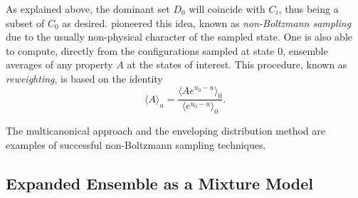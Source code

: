 \documentclass[journal=jctcce,manuscript=article,layout=twocolumn]{achemso}
\begin{document}
As explained above, the dominant set $D_0$ will coincide with $C_i$, thus being a subset of $C_0$ as desired. \citeauthor{Torrie_1977} \cite{Torrie_1977} pioneered this idea, known as \textit{non-Boltzmann sampling} due to the usually non-physical character of the sampled state. One is also able to compute, directly from the configurations sampled at state $0$, ensemble averages of any property $A$ at the states of interest. This procedure, known as \textit{reweighting}, is based on the identity \cite{Torrie_1977}
\begin{equation}
\label{eq:nbs sampling reweighting}
\langle A \rangle_u = \frac{\langle A e^{u_0 - u} \rangle_0}{\langle e^{u_0 - u} \rangle_0}.
\end{equation}

The multicanonical approach \cite{Berg_1992, Lee_1993, Abreu_2006} and the enveloping distribution method \cite{Christ_2007, *Christ_2008, *Christ_2009} are examples of successful non-Boltzmann sampling techniques.

\subsection{Expanded Ensemble as a Mixture Model}
\label{sec:expanded ensemble}
\end{document}
